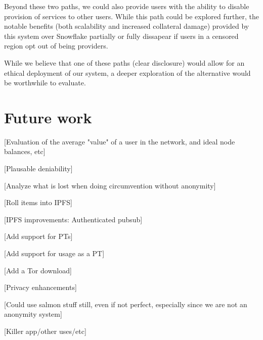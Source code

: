 \documentclass[12pt]{report}
\begin{document}
Beyond these two paths, we could also provide users with the ability to disable provision of services to other users. While this path could be explored further, the notable benefits (both scalability and increased collateral damage) provided by this system over Snowflake partially or fully dissapear if users in a censored region opt out of being providers.

While we believe that one of these paths (clear disclosure) would allow for an ethical deployment of our system, a deeper exploration of the alternative would be worthwhile to evaluate.

\section{Future work}

[Evaluation of the average "value" of a user in the network, and ideal node balances, etc]

[Plausable deniability]

[Analyze what is lost when doing circumvention without anonymity]

[Roll items into IPFS]

[IPFS improvements: Authenticated pubsub]

[Add support for PTs]

[Add support for usage as a PT]

[Add a Tor download]

[Privacy enhancements]

[Could use salmon stuff still, even if not perfect, especially since we are not an anonymity system]

[Killer app/other uses/etc]



\end{document}
